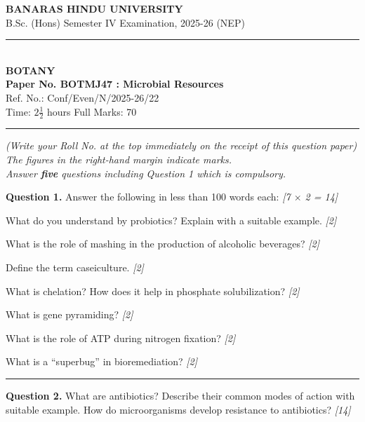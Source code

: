 \documentclass[11pt,a4paper]{article}
\newcommand{\pts}[1]{\hfill \textit{[#1]}}
\begin{document}
\begin{center}
  {\large\bfseries BANARAS HINDU UNIVERSITY}\\[2pt]
  {\normalsize B.Sc. (Hons) Semester IV Examination, 2025-26 (NEP)}\\[6pt]
  \rule{0.8\linewidth}{0.5pt}\\[6pt]
  {\large\bfseries BOTANY}\\[4pt]
  {\large\bfseries Paper No. BOTMJ47 : Microbial Resources}\\[2pt]
  {\small Ref. No.: Conf/Even/N/2025-26/22}\\[4pt]
  {\normalsize Time: $2\frac{1}{2}$ hours \hfill Full Marks: 70}
\end{center}

\rule{\linewidth}{0.4pt}

\smallskip

\noindent \textit{(Write your Roll No. at the top immediately on the receipt of this question paper)}\\[2pt]
\noindent \textit{The figures in the right-hand margin indicate marks.}\\[1pt]
\noindent \textit{Answer \textbf{five} questions including Question 1 which is compulsory.}

\bigskip

\noindent \textbf{Question 1.} Answer the following in less than 100 words each: \pts{7 $\times$ 2 = 14}
\begin{parts}
  \item What do you understand by probiotics? Explain with a suitable example. \pts{2}
  \item What is the role of mashing in the production of alcoholic beverages? \pts{2}
  \item Define the term caseiculture. \pts{2}
  \item What is chelation? How does it help in phosphate solubilization? \pts{2}
  \item What is gene pyramiding? \pts{2}
  \item What is the role of ATP during nitrogen fixation? \pts{2}
  \item What is a ``superbug'' in bioremediation? \pts{2}
\end{parts}

\bigskip
\rule{\linewidth}{0.2pt}
\bigskip

\noindent \textbf{Question 2.} What are antibiotics? Describe their common modes of action with suitable example. How do microorganisms develop resistance to antibiotics? \pts{14}
\end{document}
